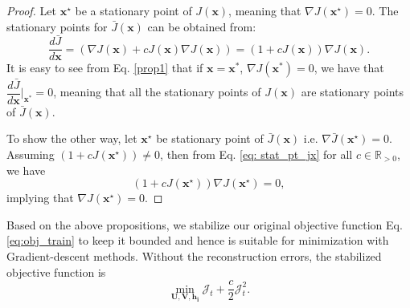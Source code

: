 \documentclass[preview,border=0.3pt]{standalone}
\begin{document}
\begin{proof}
    Let $ \bm{x}^{\star} $ be a stationary point of $ J(\bm{x}) $, meaning that $ \nabla J(\bm{x}^{\star}) = 0$. The stationary points for $ \bar{J}(\bm{x})$ can be obtained from:
    \begin{equation}\label{eq: stat_pt_jx}
        \dfrac{d \bar{J}}{d \bm{x}} =\left(\nabla J(\bm{x}) + cJ(\bm{x})\nabla J(\bm{x})\right)
        = \left(1+c J(\bm{x})\right)\nabla J(\bm{x}).
    \end{equation}
    It is easy to see from Eq. \ref{prop1} that if $ \bm{x}=\bm{x}^{*} $, $ \nabla J(\bm{x}^*) = 0$, we have that $ \dfrac{d \bar{J}}{d \bm{x}}\Big|_{\bm{x}^*}=0$, meaning that all the stationary points of  $ J(\bm{x}) $ are stationary points of $ \bar{J}(\bm{x}) $.

    To show the other way, let $\bm{x}^{\star}$ be stationary point of $\bar{J}(\bm{x})$ i.e. $\nabla \bar{J}(\bm{x}^{\star})=0.$ Assuming $(1+cJ(\bm{x}^{\star}))\neq 0$, then from Eq. \ref{eq: stat_pt_jx} for all $ c\in \mathbb{R}_{>0}$, we have
    \begin{equation*}
        \left(1+cJ(\bm{x}^{\star})\right)\nabla J(\bm{x}^{\star})=0,
    \end{equation*}
    implying that $ \nabla J(\bm{x}^{\star}) = 0$.
\end{proof}
%
Based on the above propositions, we stabilize our original objective function Eq. \ref{eq:obj_train} to keep it bounded and hence is suitable for minimization with Gradient-descent methods. Without the reconstruction errors, the stabilized objective function is
\[
    \underset{\bm{U},\bm{V},\bm{h_{i}}}{\min}\mathcal{J}_{t} + \frac{c}{2}\mathcal{J}_{t}^2.
\]
\end{document}
